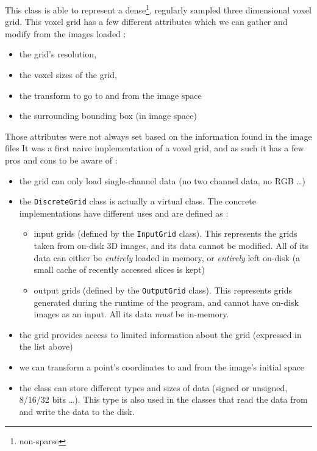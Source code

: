 {{		\vspace{\baselineskip}

		This class is able to represent a dense\footnote{non-sparse}, regularly sampled three dimensional voxel grid. This voxel grid has a few different attributes which we can gather and modify from the images loaded :\begin{itemize}
			\item the grid's resolution,
			\item the voxel sizes of the grid,
			\item the transform to go to and from the image space
			\item the surrounding bounding box (in image space)
		\end{itemize}\par

		\vspace{\baselineskip}

		Those attributes were not always set based on the information found in the image files It was a first naive implementation of a voxel grid, and as such it has a few pros and cons to be aware of :\begin{itemize}
			\item the grid can only load single-channel data (no two channel data, no RGB \ldots{})
			\item the \texttt{DiscreteGrid} class is actually a virtual class. The concrete implementations have different uses and are defined as :\begin{itemize}
					\item input grids (defined by the \texttt{InputGrid} class). This represents the grids taken from on-disk 3D images, and its data cannot be modified. All of its data can either be \textit{entirely} loaded in memory, or \textit{entirely} left on-disk (a small cache of recently accessed slices is kept)
					\item output grids (defined by the \texttt{OutputGrid} class). This represents grids generated during the runtime of the program, and cannot have on-disk images as an input. All its data \textit{must} be in-memory.
			\end{itemize}
			\item the grid provides access to limited information about the grid (expressed in the list above)
			\item we can transform a point's coordinates to and from the image's initial space
			\item the class can store different types and sizes of data (signed or unsigned, 8/16/32 bits \ldots{}). This type is also used in the classes that read the data from and write the data to the disk.
		\end{itemize}

}}
